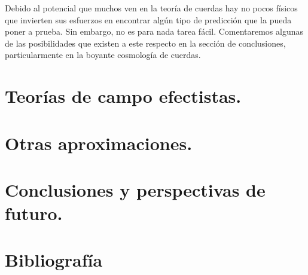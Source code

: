 \documentclass[11pt,a4paper,titlepage]{article}
\begin{document}
Debido al potencial que muchos ven en la teoría de cuerdas hay no pocos físicos que invierten sus esfuerzos en encontrar algún tipo de predicción que la pueda poner a prueba. Sin embargo, no es para nada tarea fácil. Comentaremos algunas de las posibilidades que existen a este respecto en la sección de conclusiones, particularmente en la boyante cosmología de cuerdas.

%
%
%
%
\newpage
\section{Teorías de campo efectistas.} %

%
%
%
%
\newpage
\section{Otras aproximaciones.} %

%
%
%
%
\newpage
\section{Conclusiones y perspectivas de futuro.} %


%
%
%
%
\section{Bibliografía}


\nocite{*}
\end{document}
